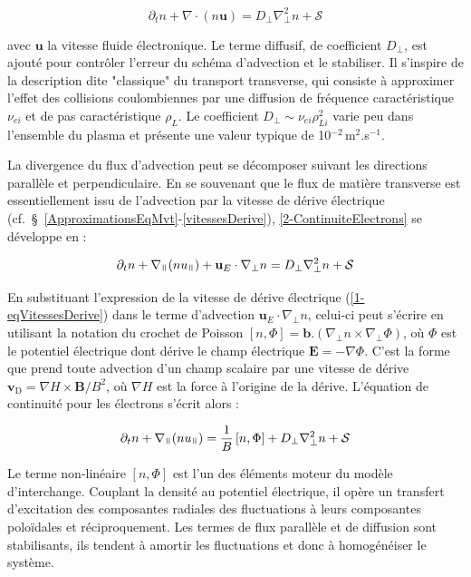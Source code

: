 \begin{refsection}
\begin{equation}
\label{2-ContinuiteElectrons}
\partial_t n + \nabla\cdot(n\mathbf{u}) = D_\perp\nabla^2_\perp n + \mathcal{S}
\end{equation}

avec $\mathbf u$ la vitesse fluide électronique. Le terme diffusif, de
coefficient $D_\perp$, est ajouté pour contrôler l'erreur du schéma d'advection et le stabiliser. Il s'inspire de la description
dite "classique" du transport transverse, qui consiste à approximer l'effet des
collisions coulombiennes par une diffusion de fréquence caractéristique
$\nu_{ei}$ et de pas caractéristique $\rho_{L}$. Le coefficient
$D_\perp\sim\nu_{ei}\rho_{Li}^2$ varie peu dans l'ensemble du plasma et présente
une valeur typique de 10$^{-2}\,$m$^2$.s$^{-1}$.

La divergence du flux d'advection peut se décomposer suivant les directions
parallèle et perpendiculaire. En se souvenant que le flux de matière
transverse est essentiellement issu de l'advection par la vitesse de dérive électrique
(cf.~\S~\ref{ApproximationsEqMvt}-\ref{vitessesDerive}), \eqref{2-ContinuiteElectrons}
se développe en :

\begin{equation}
\label{2-ContinuiteElectrons2}
\partial_t n + \nabla_\para(nu_{\para}) +
\mathbf{u}_E\cdot\nabla_\perp n = D_\perp\nabla^2_\perp n + \mathcal{S}
\end{equation}

En substituant l'expression de la vitesse de dérive électrique
(\eqref{1-eqVitessesDerive}) dans le terme d'advection
$\mathbf{u}_E\cdot\nabla_\perp n$, celui-ci peut s'écrire en utilisant la
notation du crochet de Poisson $[n,\Phi]=\mathbf{b}.(\nabla_\perp
n\times\nabla_\perp\Phi)$, où $\Phi$ est le potentiel
électrique dont dérive le champ électrique $\mathbf E=-\nabla\Phi$. C'est la
forme que prend toute advection d'un champ scalaire par une vitesse de dérive
$\mathbf{v}_\text{D}=\nabla H\times\mathbf{B}/B^2$, où $\nabla H$ est la force
à l'origine de la dérive. L'équation de continuité pour les électrons s'écrit alors :

\begin{equation}
\label{2-eqContinuiteFinale}
\partial_t n + \nabla_{\para}(nu_{\para}) =
\frac{1}{B}\left[n,\Phi\right] + D_\perp\nabla^2_\perp n + \mathcal{S}
\end{equation}

Le terme non-linéaire $[n,\Phi]$ est l'un des éléments moteur du modèle
d'interchange. Couplant la densité au potentiel électrique, il opère un
transfert d'excitation des composantes radiales des fluctuations à leurs
composantes poloïdales et réciproquement. Les termes de flux parallèle et de
diffusion sont stabilisants, ils tendent à
amortir les fluctuations et donc à homogénéiser le système.


\end{refsection}
